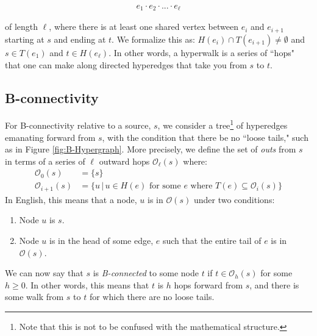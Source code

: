 \documentclass[12pt,twoside]{reedthesis}
\theoremstyle{definition}
\begin{document}
\begin{align*}
  e_1 \cdot e_2 \cdot ... \cdot e_\ell
\end{align*}

of length $\ell$, where there is at least one shared vertex between $e_i$ and $e_{i+1}$ starting at $s$ and ending at $t$. We formalize this as: $H(e_i) \cap T(e_{i+1}) \neq \emptyset$ and $s \in T(e_1)$ and $t \in H(e_\ell)$. In other words, a hyperwalk is a series of ``hops" that one can make along directed hyperedges that take you from $s$ to $t$.\par

\subsection{B-connectivity}
For B-connectivity relative to a source, $s$, we consider a tree\footnote{Note that this is not to be confused with the mathematical structure.} of hyperedges emanating forward from $s$, with the condition that there be no ``loose tails," such as in Figure \ref{fig:B-Hypergraph}. More precisely, we define the set of \textit{outs} from $s$ in terms of a series of $\ell$ outward hops $\mathcal{O}_\ell(s)$ where:
\begin{align*}
  \mathcal{O}_0(s)&=\{s\}\\
  \mathcal{O}_{i+1}(s)&=\{u \,|\, u \in H(e) \text{ for some } e \text{ where } T(e) \subseteq \mathcal{O}_i(s)\}
\end{align*}
In English, this means that a node, $u$ is in $\mathcal{O}(s)$ under two conditions:
\begin{enumerate}
  \item{Node $u$ is $s$.}
  \item{Node $u$ is in the head of some edge, $e$ such that the entire tail of $e$ is in $\mathcal{O}(s)$.}
\end{enumerate}
We can now say that $s$ is \textit{B-connected} to some node $t$ if $t \in \mathcal{O}_h(s)$ for some $h \geq 0$. In other words, this means that $t$ is $h$ hops forward from $s$, and there is some walk from $s$ to $t$ for which there are no loose tails.\par
\end{document}
